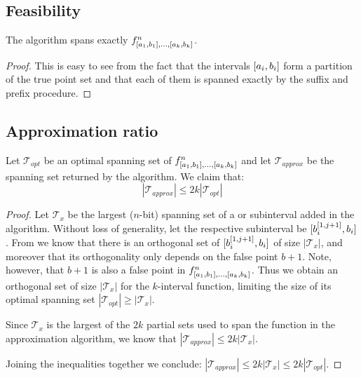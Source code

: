 
\subsection{Feasibility}
\begin{theorem}
The algorithm spans exactly
$f^n_{[a_1, b_1], \ldots, [a_k, b_k]}$.
\end{theorem}

\begin{proof}
This is easy to see from the fact that the intervals
$[a_i, b_i]$
form a partition of the true point set
and that each of them is spanned exactly
by the suffix and prefix procedure.
\end{proof}

\subsection{Approximation ratio}
\begin{theorem}
\label{theorem:2kapproxratio}
Let $\mathcal{T}_{opt}$ be an optimal spanning set of
$f^n_{[a_1, b_1], \ldots, [a_k, b_k]}$
and let $\mathcal{T}_{approx}$ be the spanning set returned
by the algorithm.
We claim that:
\begin{equation}
|\mathcal{T}_{approx}| \leq 2k |\mathcal{T}_{opt}|
\end{equation}
\end{theorem}

\begin{proof}
Let $\mathcal{T}_x$ be the largest ($n$-bit) spanning set
of a  or  subinterval
added in the algorithm.
Without loss of generality,
let the respective subinterval be 
$[b_i^{[1, j+1]}, b_i]$.
From \cite[p.~36]{Dubovsky2012} we know that
there is an orthogonal set
of $[b_i^{[1, j+1]}, b_i]$
of size $|\mathcal{T}_x|$,
and moreover that its orthogonality only depends
on the false point $b+1$.
Note, however, that $b+1$ is also a false point in
$f^n_{[a_1, b_1], \ldots, [a_k, b_k]}$.
Thus we obtain an orthogonal set of size $|\mathcal{T}_x|$
for the $k$-interval function,
limiting the size of its optimal spanning set
$|\mathcal{T}_{opt}| \geq |\mathcal{T}_x|$.

Since $\mathcal{T}_x$ is the largest
of the $2k$ partial sets used to span the function
in the approximation algorithm,
we know that
$|\mathcal{T}_{approx}| \leq 2k |\mathcal{T}_x|$.

Joining the inequalities together we conclude:
$|\mathcal{T}_{approx}| \leq 2k |\mathcal{T}_x| \leq
2k |\mathcal{T}_{opt}|$.
\end{proof}

